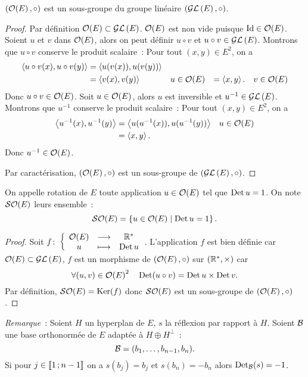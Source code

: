 \begin{theo}
  \((\mathcal{O}\!\left(E\right),\circ)\) est un sous-groupe du groupe linéaire \((\mathcal{GL}\left(E\right),\circ)\).
\end{theo}
\begin{proof}
  Par définition \(\mathcal{O}\!\left(E\right) \subset \mathcal{GL}\left(E\right)\). \(\mathcal{O}\!\left(E\right)\) est non vide puisque \(\operatorname{Id} \in \mathcal{O}\!\left(E\right)\). Soient \(u\) et \(v\) dans \(\mathcal{O}\!\left(E\right)\), alors on peut définir \(u\circ v\) et \(u \circ v \in \mathcal{GL}\left(E\right)\). Montrons que \(u \circ v\) conserve le produit scalaire~: Pour tout \((x,y) \in E^2\), on a
  \begin{align}
    \left\langle{u\circ v(x)},{u\circ v(y)}\right\rangle &= \left\langle{u(v(x))},{u(v(y))}\right\rangle \\
    &=\left\langle{v(x)},{v(y)}\right\rangle && u \in \mathcal{O}\!\left(E\right)
    &=\left\langle{x},{y}\right\rangle. && v \in \mathcal{O}\!\left(E\right)
  \end{align}
  Donc \(u \circ v \in \mathcal{O}\!\left(E\right)\). Soit \(u \in \mathcal{O}\!\left(E\right)\), alors \(u\) est inversible et \(u^{-1} \in \mathcal{GL}\left(E\right)\). Montrons que \(u^{-1}\) conserve le produit scalaire~: Pour tout \((x,y) \in E^2\), on a
  \begin{align}
    \left\langle{u^{-1}(x)},{u^{-1}(y)}\right\rangle&= \left\langle{u(u^{-1}(x))},{u(u^{-1}(y))}\right\rangle && u \in \mathcal{O}\!\left(E\right) \\
    &=\left\langle{x},{y}\right\rangle.
  \end{align}
  Donc \(u^{-1} \in \mathcal{O}\!\left(E\right)\).

  Par caractérisation, \((\mathcal{O}\!\left(E\right), \circ)\) est un sous-groupe de \((\mathcal{GL}\left(E\right),\circ)\).
\end{proof}
%
\begin{defdef}
  On appelle rotation de \(E\) toute application \(u \in \mathcal{O}\!\left(E\right)\) tel que \(\operatorname{Det} u=1\). On note \(\mathcal{SO}\!\left(E\right)\) leurs ensemble~:
  \begin{equation}
    \mathcal{SO}\!\left(E\right)=\left\{u \in \mathcal{O}\!\left(E\right)\mathrel{}\middle|\mathrel{}\operatorname{Det} u=1\right\}.
  \end{equation}  
\end{defdef}
\begin{proof}
  Soit \(f\colon \left\{\begin{array}{ccc} \mathcal{O}\!\left(E\right) & \longrightarrow &\mathbb{R}^*\\ u & \longmapsto & \operatorname{Det} u \end{array} \right.\). L'application \(f\) est bien définie car \(\mathcal{O}\!\left(E\right)\subset \mathcal{GL}\left(E\right)\), \(f\) est un morphisme de \((\mathcal{O}\!\left(E\right), \circ)\) sur \((\mathbb{R}^*,\times)\) car
  \begin{equation}
    \forall (u,v) \in \mathcal{O}\!\left(E\right)^2 \quad \operatorname{Det}(u\circ v)= \operatorname{Det} u \times \operatorname{Det} v.
  \end{equation}
  Par définition, \(\mathcal{SO}\!\left(E\right)=\operatorname{Ker}(f)\) donc \(\mathcal{SO}\!\left(E\right)\) est un sous-groupe de \((\mathcal{O}\!\left(E\right), \circ)\).
\end{proof}

\emph{Remarque}~: Soient \(H\) un hyperplan de \(E\), \(s\) la réflexion par rapport à \(H\). Soient \(\mathcal{B}\) une base orthonormée de \(E\) adaptée à \(H\oplus H^\perp\)~:
\begin{equation}
  \mathcal{B}=(b_1, \dotsc, b_{n-1}, b_n).
\end{equation}
Si pour \(j \in \mathopen{\llbracket}1\mathclose{}\mathpunct{};n-1\mathclose{\rrbracket}\) on a \(s(b_j)=b_j\) et \(s(b_n)=-b_n\) alors \(\operatorname{Det}_{\mathcal{B}}(s)=-1\).

